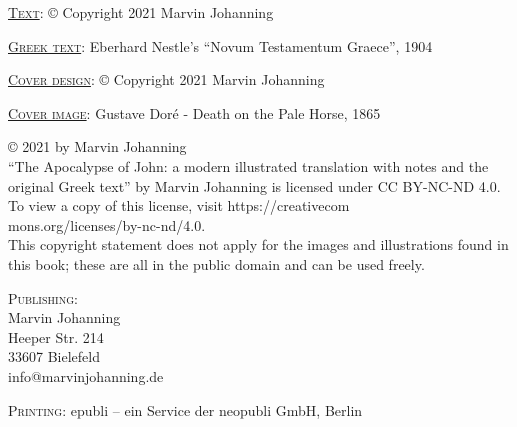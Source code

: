 \thispagestyle{empty}
\noindent\textsc{\underline{Text}}: © Copyright 2021 Marvin Johanning

\noindent\textsc{\underline{Greek text}}: Eberhard Nestle's ``Novum Testamentum Graece'', 1904

\noindent\textsc{\underline{Cover design}}: © Copyright 2021 Marvin Johanning

\noindent\textsc{\underline{Cover image}}: Gustave Doré - Death on the Pale Horse, 1865

\bigskip

\noindent© 2021 by Marvin Johanning\\``The Apocalypse of John: a modern illustrated translation with notes and the original Greek text'' by Marvin Johanning is licensed under CC BY-NC-ND 4.0. To view a copy of this license, visit https://creativecom\\mons.org/licenses/by-nc-nd/4.0.\\This copyright statement does not apply for the images and illustrations found in this book; these are all in the public domain and can be used freely. 

\vspace{10mm}\noindent\textsc{Publishing}: \\
Marvin Johanning\\
Heeper Str.  214\\
33607 Bielefeld\\
info@marvinjohanning.de

\vspace{5mm}\noindent\textsc{Printing}: epubli – ein Service der neopubli GmbH, Berlin
\newpage
